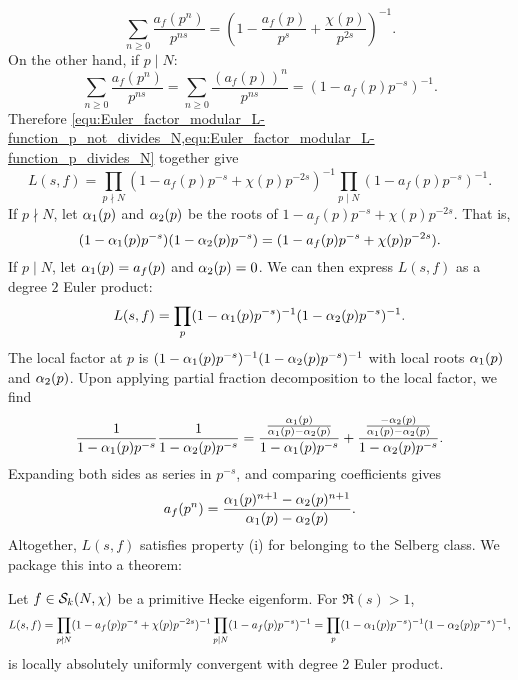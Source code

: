       \begin{equation}\label{equ:Euler_factor_modular_L-function_p_not_divides_N}
        \sum_{n \ge 0}\frac{a_{f}(p^{n})}{p^{ns}} = \left(1-\frac{a_{f}(p)}{p^{s}}+\frac{\chi(p)}{p^{2s}}\right)^{-1}.
      \end{equation}
      On the other hand, if $p \mid N$:
      \begin{equation}\label{equ:Euler_factor_modular_L-function_p_divides_N}
        \sum_{n \ge 0}\frac{a_{f}(p^{n})}{p^{ns}} = \sum_{n \ge 0}\frac{(a_{f}(p))^{n}}{p^{ns}} = \left(1-a_{f}(p)p^{-s}\right)^{-1}.
      \end{equation}
      Therefore \cref{equ:Euler_factor_modular_L-function_p_not_divides_N,equ:Euler_factor_modular_L-function_p_divides_N} together give
      \[
        L(s,f) = \prod_{p \nmid N}(1-a_{f}(p)p^{-s}+\chi(p)p^{-2s})^{-1}\prod_{p \mid N}(1-a_{f}(p)p^{-s})^{-1}.
      \]
      If $p \nmid N$, let $\alpha_{1}(p)$ and $\alpha_{2}(p)$ be the roots of $1-a_{f}(p)p^{-s}+\chi(p)p^{-2s}$. That is,
      \begin{equation}\label{equ:local_parameter_definition_modfular_forms}
        (1-\alpha_{1}(p)p^{-s})(1-\alpha_{2}(p)p^{-s}) = (1-a_{f}(p)p^{-s}+\chi(p)p^{-2s}).
      \end{equation}
      If $p \mid N$, let $\alpha_{1}(p) = a_{f}(p)$ and $\alpha_{2}(p) = 0$. We can then express $L(s,f)$ as a degree $2$ Euler product:
      \[
        L(s,f) = \prod_{p}(1-\alpha_{1}(p)p^{-s})^{-1}(1-\alpha_{2}(p)p^{-s})^{-1}.
      \]
      The local factor at $p$ is $(1-\alpha_{1}(p)p^{-s})^{-1}(1-\alpha_{2}(p)p^{-s})^{-1}$ with local roots $\alpha_{1}(p)$ and $\alpha_{2}(p)$. Upon applying partial fraction decomposition to the local factor, we find
      \[
        \frac{1}{1-\alpha_{1}(p)p^{-s}}\frac{1}{1-\alpha_{2}(p)p^{-s}} = \frac{\frac{\alpha_{1}(p)}{\alpha_{1}(p)-\alpha_{2}(p)}}{1-\alpha_{1}(p)p^{-s}}+\frac{\frac{-\alpha_{2}(p)}{\alpha_{1}(p)-\alpha_{2}(p)}}{1-\alpha_{2}(p)p^{-s}}.
      \]
      Expanding both sides as series in $p^{-s}$, and comparing coefficients gives
      \begin{equation}\label{equ:Satake_coefficient_formula}
        a_{f}(p^{n}) = \frac{\alpha_{1}(p)^{n+1}-\alpha_{2}(p)^{n+1}}{\alpha_{1}(p)-\alpha_{2}(p)}.
      \end{equation}
      Altogether, $L(s,f)$ satisfies property (i) for belonging to the Selberg class. We package this into a theorem:
      \begin{theorem}
        Let $f \in \mathcal{S}_{k}(N,\chi)$ be a primitive Hecke eigenform. For $\Re(s) > 1$,
        \[
          L(s,f) = \prod_{p \nmid N}(1-a_{f}(p)p^{-s}+\chi(p)p^{-2s})^{-1}\prod_{p \mid N}(1-a_{f}(p)p^{-s})^{-1} = \prod_{p}(1-\alpha_{1}(p)p^{-s})^{-1}(1-\alpha_{2}(p)p^{-s})^{-1},
        \]
        is locally absolutely uniformly convergent with degree $2$ Euler product.
      \end{theorem}
